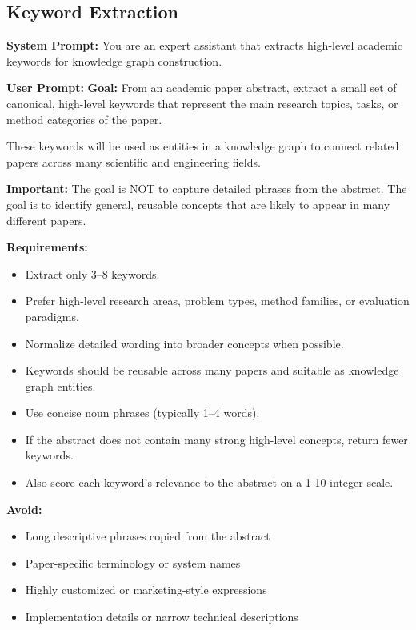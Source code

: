 \documentclass{llmxive}
\begin{document}
\subsection{Keyword Extraction}
\label{app:keyword_prompt}
\begin{tcolorbox}[breakable, colback=black!5!white, colframe=black!60!black,
  left=1ex, right=1ex, top=0.5ex, bottom=0.5ex,
  fontupper=\small\ttfamily, fontlower=\small\ttfamily,
  title=\textbf{Keyword Extraction}]
\textbf{System Prompt:}
You are an expert assistant that extracts high-level academic keywords for knowledge graph construction.

\medskip\textbf{User Prompt:}
\textbf{Goal:}
From an academic paper abstract, extract a small set of canonical, high-level keywords that represent the main research topics, tasks, or method categories of the paper.

These keywords will be used as entities in a knowledge graph to connect related papers across many scientific and engineering fields.

\textbf{Important:}
The goal is NOT to capture detailed phrases from the abstract.
The goal is to identify general, reusable concepts that are likely to appear in many different papers.

\textbf{Requirements:}
\begin{itemize}\small
\item Extract only 3--8 keywords.
\item Prefer high-level research areas, problem types, method families, or evaluation paradigms.
\item Normalize detailed wording into broader concepts when possible.
\item Keywords should be reusable across many papers and suitable as knowledge graph entities.
\item Use concise noun phrases (typically 1--4 words).
\item If the abstract does not contain many strong high-level concepts, return fewer keywords.
\item Also score each keyword's relevance to the abstract on a 1-10 integer scale.
\end{itemize}

\textbf{Avoid:}
\begin{itemize}\small
\item Long descriptive phrases copied from the abstract
\item Paper-specific terminology or system names
\item Highly customized or marketing-style expressions
\item Implementation details or narrow technical descriptions
\end{itemize}


\end{tcolorbox}
\end{document}
